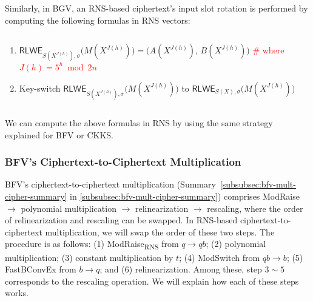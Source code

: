 $ $

Similarly, in BGV, an RNS-based ciphertext's input slot rotation is performed by computing the following formulas in RNS vectors: 

$ $

\begin{enumerate}
\item $ \textsf{RLWE}_{S(X^{J(h)}), \sigma}\bm(M(X^{J(h)})\bm) = \bm(A(X^{J(h)})$, $B(X^{J(h)})\bm)$ \textcolor{red}{ \# where $J(h) = 5^h \bmod 2n$}

\item Key-switch $\textsf{RLWE}_{S(X^{J(h)}), \sigma}\bm(M(X^{J(h)})\bm)$ to $\textsf{RLWE}_{S(X), \sigma}\bm(M(X^{J(h)})\bm)$
\end{enumerate}

$ $

We can compute the above formulas in RNS by using the same strategy explained for BFV or CKKS. 



\subsubsection{BFV's Ciphertext-to-Ciphertext Multiplication}
\label{subsubsec:rns-cipher-mult-bfv}


BFV's ciphertext-to-ciphertext multiplication (Summary~\ref*{subsubsec:bfv-mult-cipher-summary} in \autoref{subsubsec:bfv-mult-cipher-summary}) comprises \textsf{ModRaise} $\rightarrow$ polynomial multiplication $\rightarrow$ relinearization $\rightarrow$ rescaling, where the order of relinearization and rescaling can be swapped. In RNS-based ciphertext-to-ciphertext multiplication, we will swap the order of these two steps. The procedure is as follows: (1) \textsf{ModRaise\textsubscript{RNS}} from $q \rightarrow qb$; (2) polynomial multiplication; (3) constant multiplication by $t$; (4) \textsf{ModSwitch} from $qb \rightarrow b$; (5)
\textsf{FastBConvEx} from $b \rightarrow q$; and (6) relinearization. Among these, step $3 \sim 5$ corresponds to the rescaling operation. We will explain how each of these steps works. %

$ $

